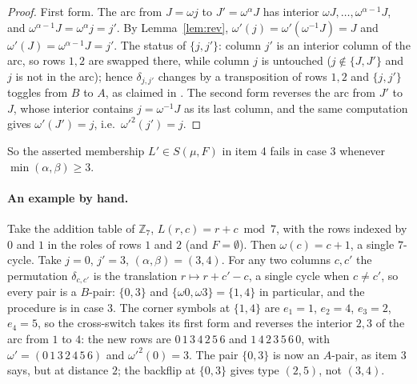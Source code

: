 \documentclass[11pt]{article}
\theoremstyle{remark}
\begin{document}
\begin{proof}
First form.  The arc from $J=\omega j$ to $J'=\omega^\alpha J$ has
interior $\omega J,\dots,\omega^{\alpha-1}J$, and $\omega^{\alpha-1}J=\omega^\alpha j=j'$.
By Lemma~\ref{lem:rev}, $\omega'(j)=\omega'(\omega^{-1}J)=J$ and
$\omega'(J)=\omega^{\alpha-1}J=j'$.  The status of $\{j,j'\}$: column
$j'$ is an interior column of the arc, so rows $1,2$ are swapped there,
while column $j$ is untouched ($j\notin\{J,J'\}$ and $j$ is not in the
arc); hence $\delta_{j,j'}$ changes by a transposition of rows $1,2$
and $\{j,j'\}$ toggles from $B$ to $A$, as claimed in \cite{CGW08}.
The second form reverses the arc from $J'$ to $J$, whose interior
contains $j=\omega^{-1}J$ as its last column, and the same computation
gives $\omega'(J')=j$, i.e.\ $\omega'^2(j')=j$.
\end{proof}

So the asserted membership $L'\in S(\mu,F)$ in item 4 fails in case 3
whenever $\min(\alpha,\beta)\ge3$.

\paragraph{An example by hand.}  Take the addition table of
$\mathbb Z_7$, $L(r,c)=r+c\bmod7$, with the rows indexed by $0$ and $1$
in the roles of rows $1$ and $2$ (and $F=\emptyset$).  Then
$\omega(c)=c+1$, a single $7$-cycle.  Take $j=0$, $j'=3$,
$(\alpha,\beta)=(3,4)$.  For any two columns $c,c'$ the permutation
$\delta_{c,c'}$ is the translation $r\mapsto r+c'-c$, a single cycle
when $c\ne c'$, so every pair is a $B$-pair: $\{0,3\}$ and
$\{\omega0,\omega3\}=\{1,4\}$ in particular, and the procedure is in
case 3.  The corner symbols at $\{1,4\}$ are $e_1=1$, $e_2=4$, $e_3=2$,
$e_4=5$, so the cross-switch takes its first form and reverses the
interior $2,3$ of the arc from $1$ to $4$: the new rows are
$0\,1\,3\,4\,2\,5\,6$ and $1\,4\,2\,3\,5\,6\,0$, with
$\omega'=(0\,1\,3\,2\,4\,5\,6)$ and $\omega'^2(0)=3$.  The pair
$\{0,3\}$ is now an $A$-pair, as item 3 says, but at distance $2$; the
backflip at $\{0,3\}$ gives type $(2,5)$, not $(3,4)$.
\end{document}
